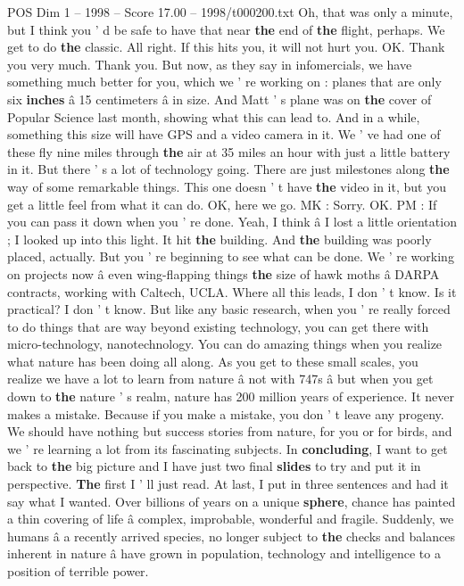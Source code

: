 \begin{textsample}{POS Dim 1 – 1998 – Score 17.00 – 1998/t000200.txt}
Oh, that was only a minute, but I think you ' d be safe to have that near \textbf{the} end of \textbf{the} flight, perhaps.
We get to do \textbf{the} classic.
All right.
If this hits you, it will not hurt you.
OK.
Thank you very much.
Thank you.
But now, as they say in infomercials, we have something much better for you, which we ' re working on : planes that are only six \textbf{inches} â 15 centimeters â in size.
And Matt ' s plane was on \textbf{the} cover of Popular Science last month, showing what this can lead to.
And in a while, something this size will have GPS and a video camera in it.
We ' ve had one of these fly nine miles through \textbf{the} air at 35 miles an hour with just a little battery in it.
But there ' s a lot of technology going.
There are just milestones along \textbf{the} way of some remarkable things.
This one doesn ' t have \textbf{the} video in it, but you get a little feel from what it can do.
OK, here we go.
MK : Sorry.
OK.
PM : If you can pass it down when you ' re done.
Yeah, I think â I lost a little orientation ; I looked up into this light.
It hit \textbf{the} building.
And \textbf{the} building was poorly placed, actually.
But you ' re beginning to see what can be done.
We ' re working on projects now â even wing-flapping things \textbf{the} size of hawk moths â DARPA contracts, working with Caltech, UCLA.
Where all this leads, I don ' t know.
Is it practical?
I don ' t know.
But like any basic research, when you ' re really forced to do things that are way beyond existing technology, you can get there with micro-technology, nanotechnology.
You can do amazing things when you realize what nature has been doing all along.
As you get to these small scales, you realize we have a lot to learn from nature â not with 747s â but when you get down to \textbf{the} nature ' s realm, nature has 200 million years of experience.
It never makes a mistake.
Because if you make a mistake, you don ' t leave any progeny.
We should have nothing but success stories from nature, for you or for birds, and we ' re learning a lot from its fascinating subjects.
In \textbf{concluding}, I want to get back to \textbf{the} big picture and I have just two final \textbf{slides} to try and put it in perspective. \textbf{The} first I ' ll just read.
At last, I put in three sentences and had it say what I wanted.
Over billions of years on a unique \textbf{sphere}, chance has painted a thin covering of life â complex, improbable, wonderful and fragile.
Suddenly, we humans â a recently arrived species, no longer subject to \textbf{the} checks and balances inherent in nature â have grown in population, technology and intelligence to a position of terrible power.

\end{textsample}
